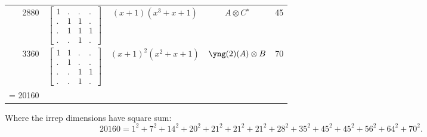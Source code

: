 \documentclass[11pt,oneside]{article}
\newcommand{\tensor}{\otimes}
\begin{document}
\begin{center}
\begin{tabular}{r|l|c|c|c}
2880  & $\begin{bmatrix}1&.&.&.\\.&1&1&.\\.&1&1&1\\.&.&1&.\end{bmatrix}$
  & $(x+1)(x^3+x+1)$  & $A\tensor C^{\star}$ & 45   \\
3360  & $\begin{bmatrix}1&1&.&.\\.&1&.&.\\.&.&1&1\\.&.&1&.\end{bmatrix}$  & $(x+1)^2(x^2+x+1)$  & $\yng(2)(A)\tensor B$ & 70 \\
\hline
\strut = 20160 \\
\end{tabular}
\end{center}
Where the irrep dimensions have square sum:
$$
 20160 = 1^2 + 7^2 + 14^2 + 20^2 + 21^2 + 21^2 + 21^2 + 28^2 + 35^2 + 45^2 + 45^2 + 56^2 + 64^2 + 70^2.
$$
\end{document}
